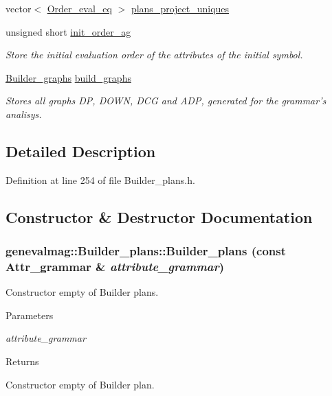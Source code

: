 \begin{DoxyCompactItemize}
vector$<$ \hyperlink{namespacegenevalmag_a0bb2e8b0fa1b07b873f0363719de7b64}{Order\_\-eval\_\-eq} $>$ \hyperlink{classgenevalmag_1_1Builder__plans_a6a64fd58a3ce6c2f4b6c69df14ffee6e}{plans\_\-project\_\-uniques}
\item 
unsigned short \hyperlink{classgenevalmag_1_1Builder__plans_abe50c9e30276ceaeea344f6a95f23db8}{init\_\-order\_\-ag}
\begin{DoxyCompactList}\small\item\em Store the initial evaluation order of the attributes of the initial symbol. \item\end{DoxyCompactList}\item 
\hyperlink{classgenevalmag_1_1Builder__graphs}{Builder\_\-graphs} \hyperlink{classgenevalmag_1_1Builder__plans_ac1d890f07dc50cc1d7383a73bb5bb5af}{build\_\-graphs}
\begin{DoxyCompactList}\small\item\em Stores all graphs DP, DOWN, DCG and ADP, generated for the grammar's analisys. \item\end{DoxyCompactList}\end{DoxyCompactItemize}


\subsection{Detailed Description}


Definition at line 254 of file Builder\_\-plans.h.



\subsection{Constructor \& Destructor Documentation}
\hypertarget{classgenevalmag_1_1Builder__plans_abd168919b4dfc51ed9c400f5afac0043}{
\subsubsection[{Builder\_\-plans}]{\setlength{\rightskip}{0pt plus 5cm}genevalmag::Builder\_\-plans::Builder\_\-plans (const {\bf Attr\_\-grammar} \& {\em attribute\_\-grammar})}}
\label{classgenevalmag_1_1Builder__plans_abd168919b4dfc51ed9c400f5afac0043}
Constructor empty of Builder plans. 
\begin{DoxyParams}{Parameters}
\item[{\em attribute\_\-grammar}]\end{DoxyParams}
\begin{DoxyReturn}{Returns}

\end{DoxyReturn}
Constructor empty of Builder plan. 

